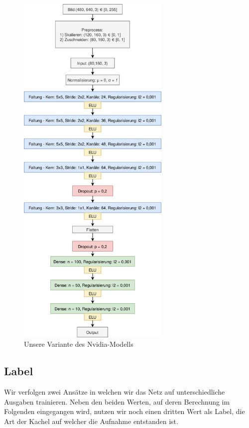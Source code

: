 \begin{figure}[H]
	\centering
	\includegraphics[width=0.65\textwidth]{kapitel4/images/drawio.png}
	\caption{Unsere Variante des Nvidia-Modells}
	\label{nvidia-model}
	\vspace{0.2cm}
\end{figure}

\subsection{Label}

Wir verfolgen zwei Ansätze in welchen wir das Netz auf unterschiedliche Ausgaben trainieren. Neben den beiden Werten, auf deren Berechnung im Folgenden eingegangen wird, nutzen wir noch einen dritten Wert als Label, die Art der Kachel auf welcher die Aufnahme entstanden ist. \\

